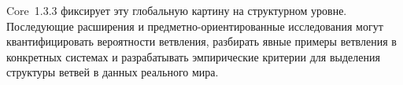Core~1.3.3 фиксирует эту глобальную картину на структурном уровне. Последующие
расширения и предметно-ориентированные исследования могут квантифицировать
вероятности ветвления, разбирать явные примеры ветвления в конкретных
системах и разрабатывать эмпирические критерии для выделения структуры
ветвей в данных реального мира.

